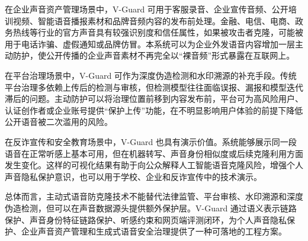 在企业声音资产管理场景中，V-Guard
可用于客服录音、企业宣传音频、公开培训视频、智能语音播报素材和品牌音频内容的发布前处理。金融、电信、电商、政务热线等行业的官方声音具有较强识别度和信任属性，如果被攻击者克隆，可能被用于电话诈骗、虚假通知或品牌仿冒。本系统可以为企业外发语音内容增加一层主动防护，使公开传播的企业声音素材不再完全以``裸音频''形式暴露在互联网上。

在平台治理场景中，V-Guard
可作为深度伪造检测和水印溯源的补充手段。传统平台治理多依赖上传后的检测与审核，但检测模型往往面临误报、漏报和模型迭代滞后的问题。主动防护可以将治理位置前移到内容发布前，平台可为高风险用户、认证创作者或企业账号提供``保护上传''功能，在不明显影响用户体验的前提下降低公开语音被二次滥用的风险。

在反诈宣传和安全教育场景中，V-Guard
也具有演示价值。系统能够展示同一段语音在正常听感上基本可用，但在机器转写、声音身份相似度或后续克隆利用方面发生变化。这样的可视化结果有助于向公众解释人工智能语音克隆风险，增强个人声音隐私保护意识，也可以用于学校、企业和反诈宣传中的技术演示。

总体而言，主动式语音防克隆技术不能替代法律监管、平台审核、水印溯源和深度伪造检测，但可以在声音数据源头提供额外保护层。V-Guard
通过语义表示链路保护、声音身份特征链路保护、听感约束和网页端评测闭环，为个人声音隐私保护、企业声音资产管理和生成式语音安全治理提供了一种可落地的工程方案。

\FloatBarrier
